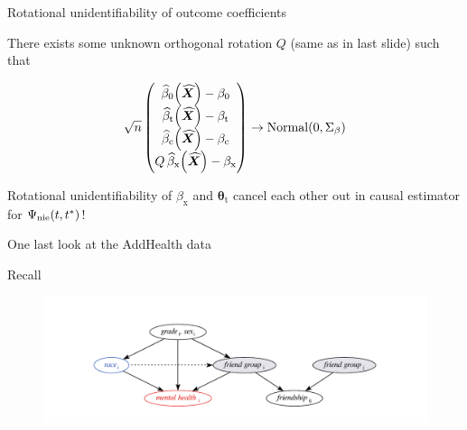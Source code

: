\documentclass{beamer}
\theoremstyle{remark}
\newcommand{\X}{\bm X}
\newcommand{\Xhat}{\widehat{\X}}
\newcommand{\thetat}{\bm \theta_\text{t}}
\newcommand{\betazero}{\beta_0}
\newcommand{\betat}{\beta_\text{t}}
\newcommand{\betac}{\beta_\text{c}}
\newcommand{\betax}{\beta_\text{x}}
\newcommand \betazerohat [1] {\widehat{\beta}_0 \paren*{#1}}
\newcommand \betathat [1] {\widehat{\beta}_\text{t} \paren*{#1}}
\newcommand \betachat [1] {\widehat{\beta}_\text{c} \paren*{#1}}
\newcommand \betaxhat [1] {\widehat{\beta}_\text{x} \paren*{#1}}
\newcommand{\nie}{\Psi_\text{nie} \paren*{t, t^*}}
\DeclarePairedDelimiter{\paren}{(}{)}
\begin{document}
\begin{frame}{Rotational unidentifiability of outcome coefficients}

    There exists some unknown orthogonal rotation $Q$ (same as in last slide) such that

    \begin{align*}
        \sqrt n
        \begin{pmatrix}
            \betazerohat{\Xhat} - \betazero \\
            \betathat{\Xhat} - \betat       \\
            \betachat{\Xhat} - \betac       \\
            Q \, \betaxhat{\Xhat} - \betax
        \end{pmatrix}
        \to
        \mathrm{Normal} \paren*{0, \Sigma_\beta}
    \end{align*}

    Rotational unidentifiability of $\betax$ and $\thetat$ cancel each other out in causal estimator for $\nie$!
\end{frame}

\begin{frame}{One last look at the AddHealth data}

    Recall

    \begin{figure}
        \centering
        \includegraphics[width=\textwidth]{figures/addhealth-dag.pdf}
        \label{fig:addhealth-dag}
    \end{figure}


\end{frame}
\end{document}
